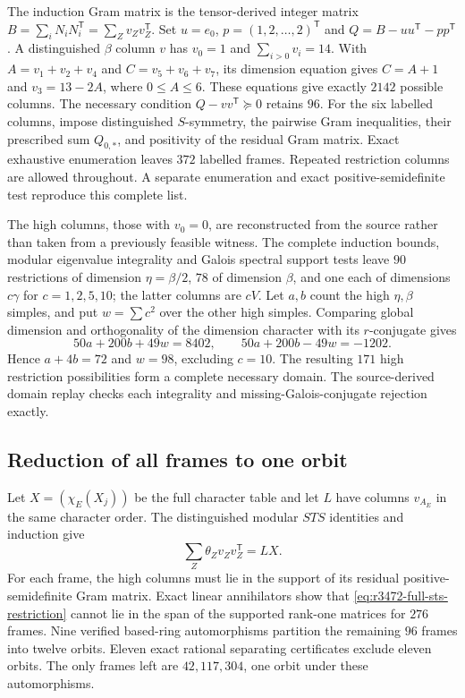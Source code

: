 The induction Gram matrix is the tensor-derived integer matrix
$B=\sum_iN_iN_i^{\mathsf T}=\sum_Zv_Zv_Z^{\mathsf T}$.
Set $u=e_0$, $p=(1,2,\ldots,2)^{\mathsf T}$ and
$Q=B-uu^{\mathsf T}-pp^{\mathsf T}$. A distinguished $\beta$ column
$v$ has $v_0=1$ and $\sum_{i>0}v_i=14$. With
$A=v_1+v_2+v_4$ and $C=v_5+v_6+v_7$, its dimension equation gives
$C=A+1$ and $v_3=13-2A$, where $0\leq A\leq6$.
These equations give exactly $2142$ possible columns. The necessary
condition $Q-vv^{\mathsf T}\succeq0$ retains $96$.
For the six labelled columns, impose distinguished $S$-symmetry, the
pairwise Gram inequalities, their prescribed sum $Q_{0,*}$, and positivity
of the residual Gram matrix. Exact exhaustive enumeration leaves $372$
labelled frames. Repeated restriction columns are allowed throughout.
A separate enumeration and exact positive-semidefinite test reproduce
this complete list.

The high columns, those with $v_0=0$, are reconstructed from the source
rather than taken from a previously feasible witness. The complete
induction bounds, modular eigenvalue integrality and Galois spectral
support tests leave $90$ restrictions of dimension
$\eta=\beta/2$, $78$ of dimension $\beta$, and one each of dimensions
$c\gamma$ for $c=1,2,5,10$; the latter columns are $cV$.
Let $a,b$ count the high $\eta,\beta$ simples, and put
$w=\sum c^2$ over the other high simples. Comparing global dimension
and orthogonality of the dimension character with its $r$-conjugate gives
\[
 50a+200b+49w=8402,\qquad
 50a+200b-49w=-1202.
\]
Hence $a+4b=72$ and $w=98$, excluding $c=10$.
The resulting $171$ high restriction possibilities form a complete
necessary domain. The source-derived domain replay checks each
integrality and missing-Galois-conjugate rejection exactly.

\subsection{Reduction of all frames to one orbit}
Let $X=(\chi_E(X_j))$ be the full character table and let $L$ have
columns $v_{A_E}$ in the same character order. The distinguished
modular $STS$ identities and induction give
\begin{equation}\label{eq:r3472-full-sts-restriction}
 \sum_Z\theta_Zv_Zv_Z^{\mathsf T}=LX.
\end{equation}
For each frame, the high columns must lie in the support of its residual
positive-semidefinite Gram matrix. Exact linear annihilators show that
\eqref{eq:r3472-full-sts-restriction} cannot lie in the span of the
supported rank-one matrices for $276$ frames.
Nine verified based-ring automorphisms partition the remaining $96$
frames into twelve orbits. Eleven exact rational separating certificates
exclude eleven orbits. The only frames left are $42,117,304$, one orbit
under these automorphisms.

